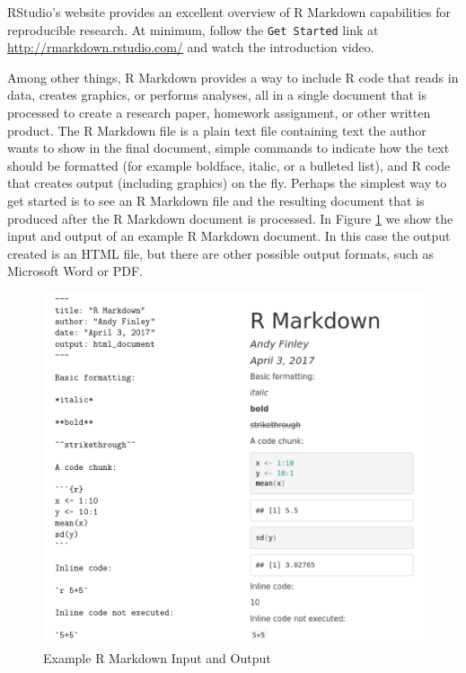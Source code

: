 \documentclass[
]{krantz}
\begin{document}
RStudio's website provides an excellent overview of R Markdown capabilities for reproducible research. At minimum, follow the \texttt{Get\ Started} link at \url{http://rmarkdown.rstudio.com/} and watch the introduction video.

Among other things, R Markdown provides a way to include R code that reads in data, creates graphics, or performs analyses, all in a single document that is processed to create a research paper, homework assignment, or other written product. The R Markdown file is a plain text file containing text the author wants to show in the final document, simple commands to indicate how the text should be formatted (for example boldface, italic, or a bulleted list), and R code that creates output (including graphics) on the fly. Perhaps the simplest way to get started is to see an R Markdown file and the resulting document that is produced after the R Markdown document is processed. In Figure \ref{fig:rmark} we show the input and output of an example R Markdown document. In this case the output created is an HTML file, but there are other possible output formats, such as Microsoft Word or PDF.

\begin{figure}

{\centering \includegraphics[width=1\linewidth]{../figures/rmarkdownInputOutput} 

}

\caption{Example R Markdown Input and Output}\label{fig:rmark}
\end{figure}
\end{document}
